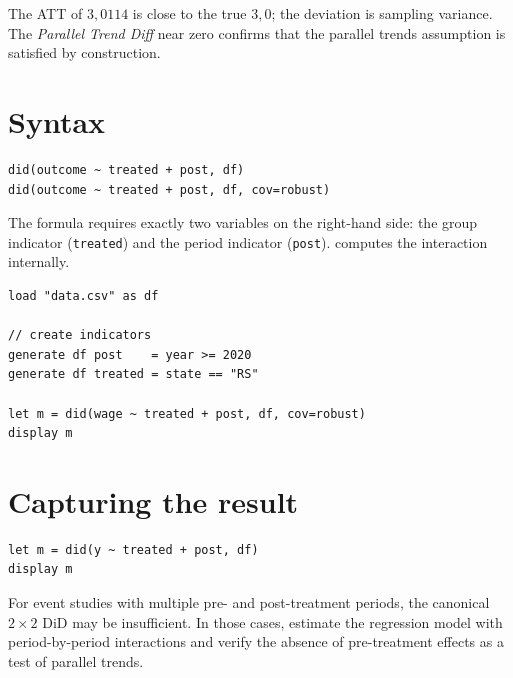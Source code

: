 The ATT of $3{,}0114$ is close to the true $3{,}0$; the deviation is sampling
variance. The \emph{Parallel Trend Diff} near zero confirms that the
parallel trends assumption is satisfied by construction.

\section{Syntax}

\begin{lstlisting}
did(outcome ~ treated + post, df)
did(outcome ~ treated + post, df, cov=robust)
\end{lstlisting}

The formula requires exactly two variables on the right-hand side: the group
indicator (\lstinline{treated}) and the period indicator (\lstinline{post}).
\hayashi{} computes the interaction internally.

\begin{lstlisting}[caption={Typical DiD workflow}]
load "data.csv" as df

// create indicators
generate df post    = year >= 2020
generate df treated = state == "RS"

let m = did(wage ~ treated + post, df, cov=robust)
display m
\end{lstlisting}

\section{Capturing the result}

\begin{lstlisting}
let m = did(y ~ treated + post, df)
display m
\end{lstlisting}

\begin{nota}
  For event studies with multiple pre- and post-treatment periods,
  the canonical $2\times 2$ DiD may be insufficient. In those cases,
  estimate the regression model with period-by-period interactions and
  verify the absence of pre-treatment effects as a test of
  parallel trends.
\end{nota}
